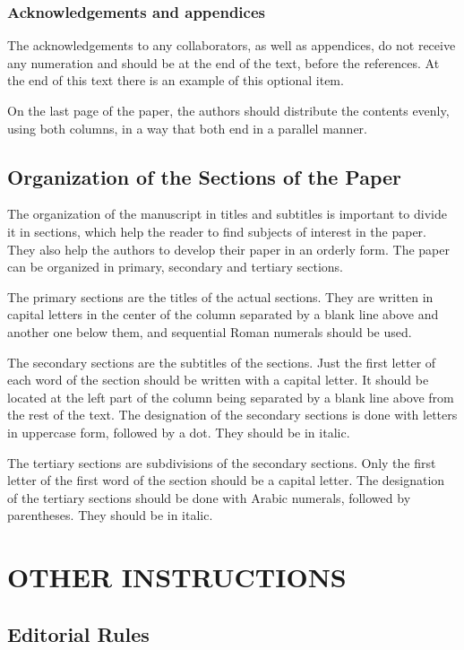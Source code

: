 \documentclass[english]{sobraep}
\begin{document}
\subsubsection{Acknowledgements and appendices}

The acknowledgements to any collaborators, as well as appendices, do not receive any numeration and should be at the end of the text, before the references. At the end of this text there is an example of this optional item.

On the last page of the paper, the authors should distribute the contents evenly, using both columns, in a way that both end in a parallel manner.

\subsection{Organization of the Sections of the Paper}

The organization of the manuscript in titles and subtitles is important to divide it in sections, which help the reader to find subjects of interest in the paper. They also help the authors to develop their paper in an orderly form. The paper can be organized in primary, secondary and tertiary sections.

The primary sections are the titles of the actual sections. They are written in capital letters in the center of the column separated by a blank line above and another one below them, and sequential Roman numerals should be used.

The secondary sections are the subtitles of the sections. Just the first letter of each word of the section should be written with a capital letter. It should be located at the left part of the column being separated by a blank line above from the rest of the text. The designation of the secondary sections is done with letters in uppercase form, followed by a dot. They should be in italic.

The tertiary sections are subdivisions of the secondary sections. Only the first letter of the first word of the section should be a capital letter. The designation of the tertiary sections should be done with Arabic numerals, followed by parentheses. They should be in italic.

\section{OTHER INSTRUCTIONS}

\subsection{Editorial Rules}
\end{document}
